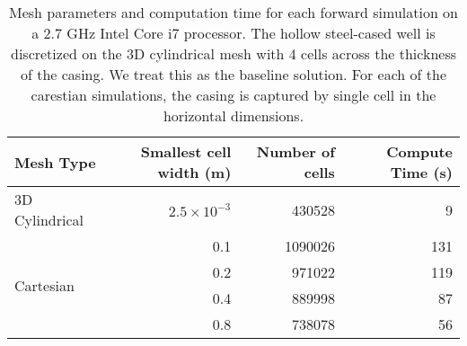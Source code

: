 \begin{table}
\centering
    \caption{
        Mesh parameters and computation time for each forward simulation on a 2.7 GHz Intel Core i7 processor.
        The hollow steel-cased well is discretized on the 3D cylindrical mesh with 4 cells across the thickness
        of the casing. We treat this as the baseline solution. For each of the carestian simulations, the casing is
        captured by single cell in the horizontal dimensions.
    }
    \begin{tabular}[htb]{| l | r | r | r |}
        \hline
        \textbf{Mesh Type} & \textbf{Smallest cell width (m)} & \textbf{Number of cells} & \textbf{Compute Time (s)} \\
        \hline
        3D Cylindrical & $2.5 \times 10^{-3}$ & 430528 & 9 \\
        \hline
        \multirow{4}{*}{Cartesian} & 0.1 & 1090026 & 131 \\
                                  & 0.2 & 971022 & 119 \\
                                  & 0.4 & 889998 & 87 \\
                                  & 0.8 & 738078 & 56 \\
        \hline
    \end{tabular}
    \label{tab:cartesian_simulation}
 \end{table}
